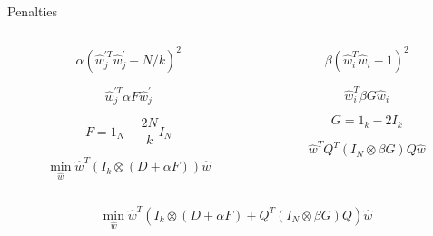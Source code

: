 	\begin{frame}{Penalties}
		\begin{columns}
			\begin{column}{0.5\textwidth}
				$$\alpha\left(\hat{w}_{j}^{\prime T} \hat{w}_{j}^{\prime}-N / k\right)^{2}$$

				$$\hat{w}_{j}^{\prime T} \alpha F \hat{w}_{j}^{\prime}$$

				$$F=1_{N}-\frac{2 N}{k} I_{N}$$

				$$\min _{\hat{w}} \hat{w}^{T}\left(I_{k} \otimes(D+\alpha F)\right) \hat{w}$$
			\end{column}
			\begin{column}{0.5\textwidth}  
				$$\beta\left(\hat{w}_{i}^{T} \hat{w}_{i}-1\right)^{2}$$

				$$\hat{w}_{i}^{T} \beta G \hat{w}_{i}$$

				$$G=1_{k}-2 I_{k}$$

				$$\hat{w}^{T} Q^{T}\left(I_{N} \otimes \beta G\right) Q \hat{w}$$
			\end{column}
		\end{columns}
		\bigbreak
		$$\min _{\hat{w}} \hat{w}^{T}\left(I_{k} \otimes(D+\alpha F)+Q^{T}\left(I_{N} \otimes \beta G\right) Q\right) \hat{w}$$
	\end{frame}


	
	

